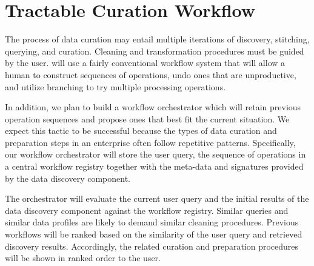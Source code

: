 \section{Tractable Curation Workflow}
\label{sec:workflow}

The process of data curation may entail multiple iterations of discovery,
stitching, querying, and curation. Cleaning and
transformation procedures must be guided by the user. \dcv will use a fairly
conventional workflow system that will allow a human to construct sequences of
operations, undo ones that are unproductive, and utilize branching to try
multiple processing operations.


In addition, we plan to build a workflow orchestrator which will retain previous
operation sequences and propose ones that best fit the current situation. We
expect this tactic to be successful because the types of data curation and
preparation steps in an enterprise often follow repetitive patterns.
Specifically, our workflow orchestrator will store the user query, the sequence
of operations in a central workflow registry together with the meta-data and
signatures provided by the data discovery component. 


The orchestrator will evaluate the current user query and the initial results of
the data discovery component against the workflow registry. Similar queries and
similar data profiles are likely to demand similar cleaning procedures. Previous
workflows will be ranked based on the similarity of the user query and retrieved
discovery results. Accordingly, the related curation and preparation procedures
will be shown in ranked order to the user.
